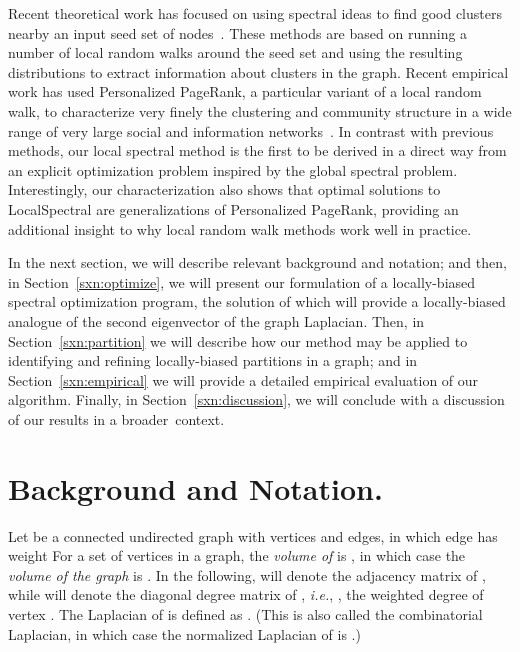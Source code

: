 \documentclass[11pt]{article}
\begin{document}
Recent theoretical work has focused on using spectral ideas to find good 
clusters nearby an input seed set of 
nodes~\cite{Spielman:2004,andersen06local,chung07_fourproofs}. 
These methods are based on running a number of local random walks around the 
seed set and using the resulting distributions to extract information about 
clusters in the graph.
Recent empirical work has used Personalized PageRank, a particular variant 
of a local random walk, to characterize very finely the clustering and 
community structure in a wide range of very large social and information 
networks~\cite{andersen06seed,LLDM08_communities_CONF,LLDM09_communities_IM,LLM10_communities_CONF}. 
In contrast with previous methods, our local spectral method is the first to 
be derived in a direct way from an explicit optimization problem inspired 
by the global spectral problem.  
Interestingly, our characterization also shows that optimal solutions to 
\textsf{LocalSpectral} are  generalizations of Personalized PageRank, 
providing an additional insight to why local random walk methods work well 
in practice.

In the next section, we will describe relevant background and notation; and 
then, in Section~\ref{sxn:optimize}, we will present our formulation of a 
locally-biased spectral optimization program, the solution of which will 
provide a locally-biased analogue of the second eigenvector of the graph 
Laplacian. 
Then, in Section~\ref{sxn:partition} we will describe how our method may be 
applied to identifying and refining locally-biased partitions in a graph; and
in Section~\ref{sxn:empirical} we will provide a detailed empirical 
evaluation of our algorithm.
Finally, in Section~\ref{sxn:discussion}, we will conclude with a discussion 
of our results in a broader~context.



\section{Background and Notation.} 
\label{sxn:background}

Let  be a connected undirected graph with  vertices and 
 edges, in which edge  has weight 
For a set of vertices  in a graph, the \emph{volume of } 
is , in which case the \emph{volume of the
graph } is . 
In the following,  will denote the 
adjacency matrix of , while  will denote 
the diagonal degree matrix of , \emph{i.e.},  
, the weighted degree of vertex .
The Laplacian of  is defined as . 
(This is also called the combinatorial Laplacian, in which case the
normalized Laplacian of  is .)
\end{document}
